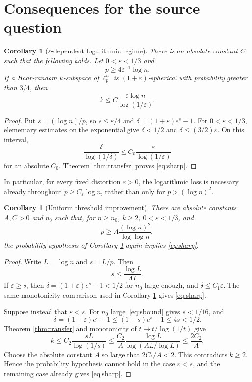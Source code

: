 \documentclass[11pt]{article}
\newtheorem{corollary}[theorem]{Corollary}
\newcommand{\eps}{\varepsilon}
\begin{document}
\section{Consequences for the source question}

\begin{corollary}[$\eps$-dependent logarithmic regime]\label{cor:eps}
There is an absolute constant $C$ such that the following holds.  Let
$0<\eps<1/3$ and
\[
      p\ge 4\eps^{-1}\log n.
\]
If a Haar-random $k$-subspace of $\ell_p^n$ is $(1+\eps)$-spherical with
probability greater than $3/4$, then
\begin{equation}\label{eq:sharp}
      k\le C\frac{\eps\log n}{\log(1/\eps)}.
\end{equation}
\end{corollary}

\begin{proof}
Put $s=(\log n)/p$, so $s\le\eps/4$ and
$\delta=(1+\eps)e^s-1$.  For $0<\eps<1/3$, elementary estimates on the
exponential give $\delta<1/2$ and $\delta\le(3/2)\eps$.  On this interval,
\[
 \frac{\delta}{\log(1/\delta)}
 \le C_0\frac{\eps}{\log(1/\eps)}
\]
for an absolute $C_0$.  Theorem \ref{thm:transfer} proves
\eqref{eq:sharp}.
\end{proof}

In particular, for every fixed distortion $\eps>0$, the logarithmic loss is
necessary already throughout $p\ge C_\eps\log n$, rather than only for
$p>(\log n)^2$.

\begin{corollary}[Uniform threshold improvement]\label{cor:uniform}
There are absolute constants $A,C>0$ and $n_0$ such that, for
$n\ge n_0$, $k\ge2$, $0<\eps<1/3$, and
\[
      p\ge A\frac{(\log n)^2}{\log\log n},
\]
the probability hypothesis of Corollary \ref{cor:eps} again implies
\eqref{eq:sharp}.
\end{corollary}

\begin{proof}
Write $L=\log n$ and $s=L/p$.  Then
\begin{equation}\label{eq:sbound}
 s\le \frac{\log L}{A L}.
\end{equation}
If $\eps\ge s$, then $\delta=(1+\eps)e^s-1<1/2$ for $n_0$ large enough,
and $\delta\le C_1\eps$.  The same monotonicity comparison used in
Corollary \ref{cor:eps} gives \eqref{eq:sharp}.

Suppose instead that $\eps<s$.  For $n_0$ large, \eqref{eq:sbound} gives
$s<1/16$, and
\[
 \delta=(1+\eps)e^s-1\le(1+s)e^s-1\le4s<1/2.
\]
Theorem \ref{thm:transfer} and monotonicity of
$t\mapsto t/\log(1/t)$ give
\[
 k\le C_2\frac{sL}{\log(1/s)}
 \le \frac{C_2}{A}
       \frac{\log L}{\log(AL/\log L)}
 \le \frac{2C_2}{A}.
\]
Choose the absolute constant $A$ so large that $2C_2/A<2$.  This contradicts
$k\ge2$.  Hence the probability hypothesis cannot hold in the case
$\eps<s$, and the remaining case already gives \eqref{eq:sharp}.
\end{proof}
\end{document}
